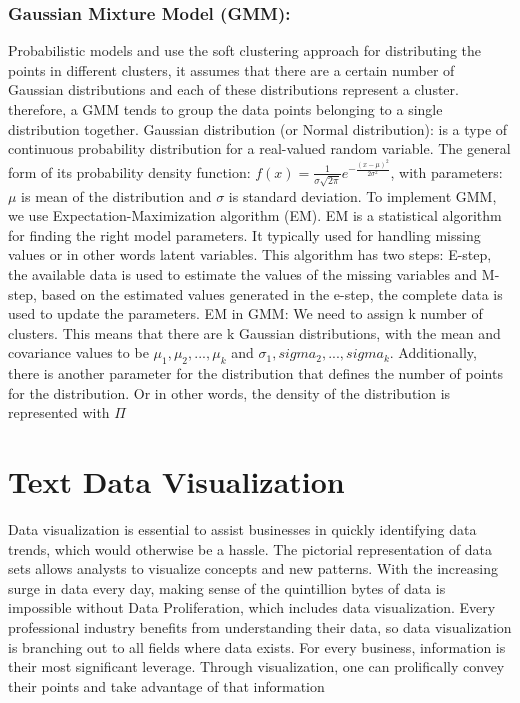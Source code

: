 \documentclass[a4paper,12pt]{report}
\begin{document}
    \subsubsection{Gaussian Mixture Model (GMM): }
    Probabilistic models and use the soft clustering approach for distributing the points in different clusters, it assumes that there are a certain number of Gaussian distributions and each of these distributions represent a cluster. therefore, a GMM tends to group the data points belonging to a single distribution together.
    \newline\newline
    Gaussian distribution (or Normal distribution)\cite{GMM}: is a type of continuous probability distribution for a real-valued random variable. The general form of its probability density function:
    $f(x) = \frac{1}{\sigma \sqrt{2\pi}}e^{-\frac{(x-\mu)^2}{2\sigma^2}}$, with parameters: $\mu$ is mean of the distribution and $\sigma$ is standard deviation.
    \newline\newline
    To implement GMM, we use Expectation-Maximization algorithm (EM)\cite{GMM}. EM is a statistical algorithm for finding the right model parameters.
    It typically used for handling missing values or in other words latent variables. This algorithm has two steps: E-step, the available data is used to estimate the values of the missing variables
    and M-step, based on the estimated values generated in the e-step, the complete data is used to update the parameters.
    \newline\newline
    EM in GMM\cite{GMM}: We need to assign k number of clusters. This means that there are k Gaussian distributions, with the mean and covariance values to be $\mu_1, \mu_2, ..., \mu_k$
    and $\sigma_1, sigma_2, ..., sigma_k$. Additionally, there is another parameter for the distribution that defines the number of points for the distribution. Or in other words, the density of the distribution is represented with $\Pi$


    \section{Text Data Visualization}
    Data visualization is essential to assist businesses in quickly identifying data trends, which would otherwise be a hassle. The pictorial representation of data sets allows analysts to visualize concepts and new patterns. With the increasing surge in data every day, making sense of the quintillion bytes of data is impossible without Data Proliferation, which includes data visualization.
    \newline\newline
    Every professional industry benefits from understanding their data, so data visualization\cite{DataVizImportance} is branching out to all fields where data exists. For every business, information is their most significant leverage. Through visualization, one can prolifically convey their points and take advantage of that information
    
\end{document}
